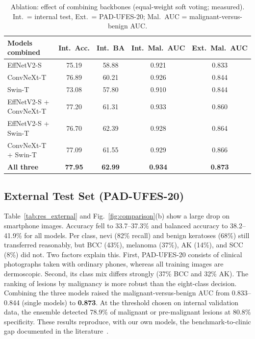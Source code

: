 \begin{table}[t]
\centering
\caption{Ablation: effect of combining backbones (equal-weight soft
voting; measured). Int.\ = internal test, Ext.\ = PAD-UFES-20; Mal.\ AUC =
malignant-versus-benign AUC.}
\label{tab:ablation}
\renewcommand{\arraystretch}{1.12}
\footnotesize
\setlength{\tabcolsep}{3.5pt}
\begin{tabularx}{\columnwidth}{@{}Y c c c c@{}}
\toprule
\textbf{Models combined} & \textbf{Int.\ Acc.} & \textbf{Int.\ BA} & \textbf{Int.\ Mal.\ AUC} & \textbf{Ext.\ Mal.\ AUC} \\
\midrule
EffNetV2-S & 75.19 & 58.88 & 0.921 & 0.833 \\
ConvNeXt-T & 76.89 & 60.21 & 0.926 & 0.844 \\
Swin-T & 73.08 & 57.80 & 0.910 & 0.844 \\
\midrule
EffNetV2-S + ConvNeXt-T & 77.20 & 61.31 & 0.933 & 0.860 \\
EffNetV2-S + Swin-T & 76.70 & 62.39 & 0.928 & 0.864 \\
ConvNeXt-T + Swin-T & 77.09 & 61.55 & 0.929 & 0.866 \\
\midrule
\textbf{All three} & \textbf{77.95} & \textbf{62.99} & \textbf{0.934} & \textbf{0.873} \\
\bottomrule
\end{tabularx}
\end{table}

\subsection{External Test Set (PAD-UFES-20)}
Table~\ref{tab:res_external} and Fig.~\ref{fig:comparison}(b) show a
large drop on smartphone images. Accuracy fell to 33.7--37.3\% and
balanced accuracy to 38.2--41.9\% for all models. Per class, nevi (82\%
recall) and benign keratoses (68\%) still transferred reasonably, but
BCC (43\%), melanoma (37\%), AK (14\%), and SCC (8\%) did not. Two
factors explain this. First, PAD-UFES-20 consists of clinical photographs
taken with ordinary phones, whereas all training images are dermoscopic.
Second, its class mix differs strongly (37\% BCC and 32\% AK). The
ranking of lesions by malignancy is more robust than the eight-class
decision. Combining the three models raised the malignant-versus-benign
AUC from 0.833--0.844 (single models) to \textbf{0.873}. At the threshold
chosen on internal validation data, the ensemble detected 78.9\% of
malignant or pre-malignant lesions at 80.8\% specificity. These results
reproduce, with our own models, the benchmark-to-clinic gap documented
in the literature~\cite{menzies2023,tschandl2019comparison}.

